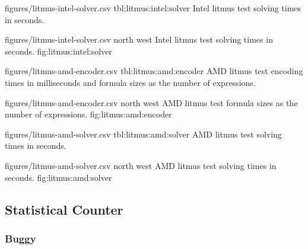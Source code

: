 \newpage


\SolverStatsTable
  {figures/litmus-intel-solver.csv}
  {tbl:litmus:intel:solver}
  {Intel litmus test solving times in seconds.}

\SolverStatsGraph
  {figures/litmus-intel-solver.csv}
  {north west}
  {Intel litmus test solving times in seconds.}
  {fig:litmus:intel:solver}

\newpage


\renewcommand{\StatsTableRowHeader}[1]{\hyperref[tbl:litmus:amd:#1]{#1}}

\EncoderStatsTable
  {figures/litmus-amd-encoder.csv}
  {tbl:litmus:amd:encoder}
  {AMD litmus test encoding times in milliseconds and formula sizes as the number of expressions.}

\EncoderStatsGraph
  {figures/litmus-amd-encoder.csv}
  {north west}
  {AMD litmus test formula sizes as the number of expressions.}
  {fig:litmus:amd:encoder}

\newpage

\SolverStatsTable
  {figures/litmus-amd-solver.csv}
  {tbl:litmus:amd:solver}
  {AMD litmus test solving times in seconds.}

\SolverStatsGraph
  {figures/litmus-amd-solver.csv}
  {north west}
  {AMD litmus test solving times in seconds.}
  {fig:litmus:amd:solver}

\newpage

\subsection*{Statistical Counter}

\subsubsection*{Buggy}

\renewcommand{\StatsTableRowHeader}[1]{#1}

